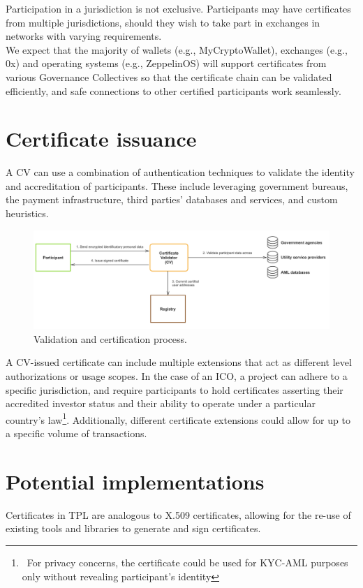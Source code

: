 \documentclass[10pt]{article}
\begin{document}
\noindent Participation in a jurisdiction is not exclusive. Participants may have certificates from multiple jurisdictions, should they wish to take part in exchanges in networks with varying requirements. \\

\noindent We expect that the majority of wallets (e.g., MyCryptoWallet), exchanges (e.g., 0x) and operating systems (e.g., ZeppelinOS) will support certificates from various Governance Collectives so that the certificate chain can be validated efficiently, and safe connections to other certified participants work seamlessly.\\

\section{Certificate issuance}
A CV can use a combination of authentication techniques to validate the identity and accreditation of participants. These include leveraging government bureaus, the payment infrastructure, third parties' databases and services, and custom heuristics. \\

\begin{figure}[ht]
    \centering
    \includegraphics[width=0.8\linewidth]{figures/figure2.png}
    \caption{Validation and certification process.}
    \label{fig:fig2}
\end{figure}

\noindent A CV-issued certificate can include multiple extensions that act as different level authorizations or usage scopes. In the case of an ICO, a project can adhere to a specific jurisdiction, and require participants to hold certificates asserting their accredited investor status and their ability to operate under a particular country’s law\footnote{\ For privacy concerns, the certificate could be used for KYC-AML purposes only without revealing participant’s identity}. Additionally, different certificate extensions could allow for up to a specific volume of transactions.\\

\section{Potential implementations}
Certificates in TPL are analogous to X.509 certificates\cite{x509}, allowing for the re-use of existing tools and libraries to generate and sign certificates.\\
\end{document}

